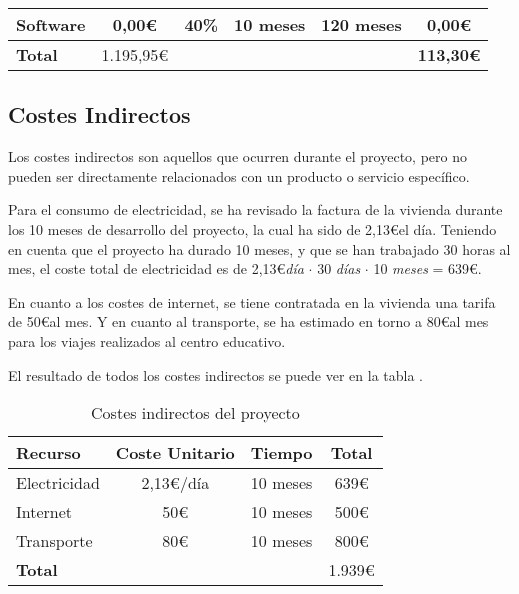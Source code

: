 \begin{table}[htbp]
\begin{adjustbox}{max width=\textwidth}
\begin{tabular}{@{}lccccc@{}}
    Software          & 0,00\euro                                  & 40\%                                 & 10 meses                                      & 120 meses                                     & 0,00\euro                                             \\ \midrule
    \textbf{Total}    & 1.195,95\euro                              &                                      &                                               &                                               & \textbf{113,30\euro}                                  \\ \bottomrule
    \end{tabular}
    \end{adjustbox}
\end{table}


\subsection{Costes Indirectos}\label{subsec:costes_indirectos}
Los costes indirectos son aquellos que ocurren durante el proyecto, pero no pueden ser directamente relacionados con un producto o servicio específico.

Para el consumo de electricidad, se ha revisado la factura de la vivienda durante los 10 meses de desarrollo del proyecto, la cual ha sido de 2,13\euro el día. Teniendo en cuenta que el proyecto ha durado 10 meses, y que se han trabajado 30 horas al mes, el coste total de electricidad es de 2,13\euro \textit{día} $\cdot$ 30 \textit{días} $\cdot$ 10 \textit{meses} = 639\euro. 

En cuanto a los costes de internet, se tiene contratada en la vivienda una tarifa de 50\euro al mes. Y en cuanto al transporte, se ha estimado en torno a 80\euro al mes para los viajes realizados al centro educativo.

El resultado de todos los costes indirectos se puede ver en la tabla .

\begin{table}[htbp]
    \centering
    \caption{Costes indirectos del proyecto}
    \label{tab:costes_indirectos}
    
    \begin{tabular}{@{}lccc@{}}
    \toprule
    Recurso        & Coste Unitario & Tiempo   & \textbf{Total} \\ \midrule
    Electricidad   & 2,13\euro/día      & 10 meses & 639\euro           \\
    Internet       & 50\euro            & 10 meses & 500\euro           \\
    Transporte     & 80\euro            & 10 meses & 800\euro           \\ \midrule
    \textbf{Total} &                &          & 1.939\euro         \\ \bottomrule
    \end{tabular}
    \end{table}


